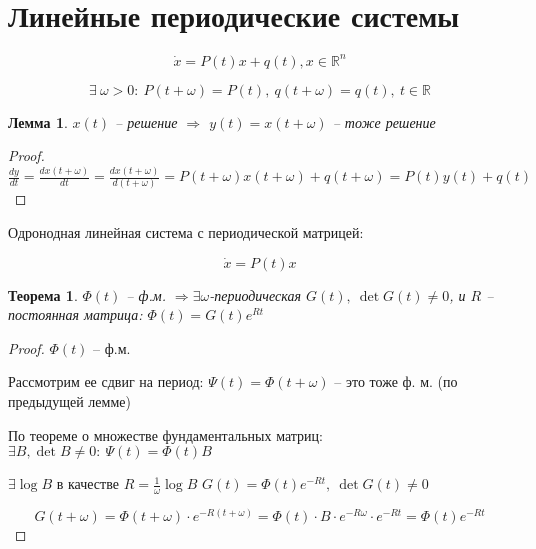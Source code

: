 \documentclass[a4paper]{article}
\theoremstyle{indented}
\newtheorem*{theorem}{Теорема}
\newtheorem*{lemma}{Лемма}
\theoremstyle{definition}
\theoremstyle{remark}
\begin{document}
\section{Линейные периодические системы}

\[\dot x = P(t) x + q(t), x \in \mathbb{R}^n\]

\[\exists \ \omega > 0: \ P(t+\omega) = P(t), \ q(t + \omega) = q(t), \ t \in \mathbb{R}\]

\begin{lemma}
  $x(t)$ --  решение $\Rightarrow $ $y(t) = x(t+\omega)$ -- тоже решение
  
\end{lemma}
\begin{proof}
  $\frac{dy}{dt} = \frac{dx(t+\omega)}{dt} = \frac{dx(t+\omega)}{d(t + \omega)} = P(t+\omega)x(t+\omega) + q(t+\omega) = P(t)y(t) + q(t)$
\end{proof}

Одронодная линейная система с периодической матрицей:

\[\dot x = P(t) x\]
\begin{theorem}

  $\Phi(t)$ -- ф.м. $\Rightarrow  \exists \omega$-периодическая $G(t),\ \det G(t) \neq 0$, и $R$ -- постоянная матрица: $\Phi(t) = G(t)e^{Rt}$ 
\end{theorem}
\begin{proof}
  $\Phi(t)$ -- ф.м.

  Рассмотрим ее сдвиг на период: $\Psi(t) = \Phi(t+\omega)$ -- это тоже ф. м. (по предыдущей лемме)

  По теореме о множестве фундаментальных матриц: $\exists B, \det B \neq 0: \ \Psi(t) = \Phi(t) B$

  $\exists \log B$ в качестве $R = \frac{1}{\omega}\log B$
  $G(t) = \Phi(t) e^{-Rt}, \ \det G(t) \neq 0$

  \[G(t+\omega) = \Phi(t+\omega) \cdot e^{-R(t+\omega)} = \Phi(t) \cdot B \cdot e^{-R\omega} \cdot e^{-Rt} = \Phi(t) e^{-Rt}\]
  
\end{proof}
\end{document}
